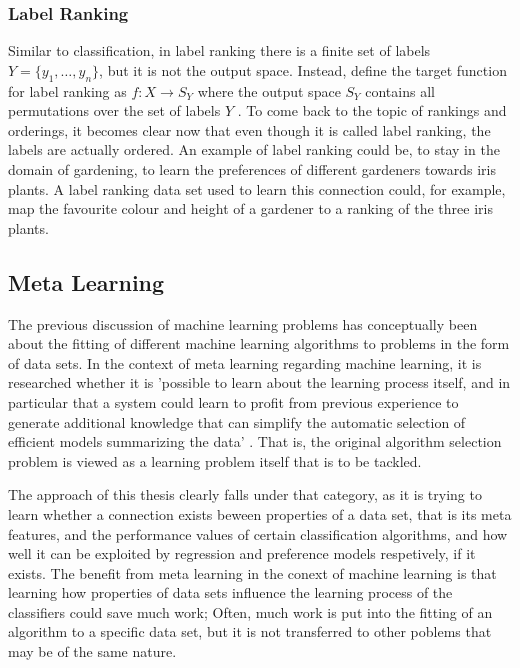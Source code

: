 \subsubsection{Label Ranking}
Similar to classification, in label ranking there is a finite set of labels $Y=\lbrace y_1,\dots,y_n \rbrace$, but it is not the output space. Instead, \citeauthor{DBLP:books/daglib/0025729} define the target function for label ranking as $f:X\rightarrow S_Y$ where the output space $S_Y$ contains all permutations over the set of labels $Y$ \cite{DBLP:books/daglib/0025729}. To come back to the topic of rankings and orderings, it becomes clear now that even though it is called label ranking, the labels are actually ordered. An example of label ranking could be, to stay in the domain of gardening, to learn the preferences of different gardeners towards iris plants. A label ranking data set used to learn this connection could, for example, map the favourite colour and height of a gardener to a ranking of the three iris plants. 

\subsection{Meta Learning}
The previous discussion of machine learning problems has conceptually been about the fitting of different machine learning algorithms to problems in the form of data sets. In the context of meta learning regarding machine learning, it is researched whether it is 'possible to learn about the learning process itself, and in particular that a system could learn to profit from previous experience to generate additional knowledge that can simplify the automatic selection of efficient models summarizing the data' \cite{brazdil2008metalearning}. That is, the original algorithm selection problem \cite{rice1976algorithm} is viewed as a learning problem itself that is to be tackled.

The approach of this thesis clearly falls under that category, as it is trying to learn whether a connection exists beween properties of a data set, that is its meta features, and the performance values of certain classification algorithms, and how well it can be exploited by regression and preference models respetively, if it exists. The benefit from meta learning in the conext of machine learning is that learning how properties of data sets influence the learning process of the classifiers could save much work; Often, much work is put into the fitting of an algorithm to a specific data set, but it is not transferred to other poblems that may be of the same nature.

